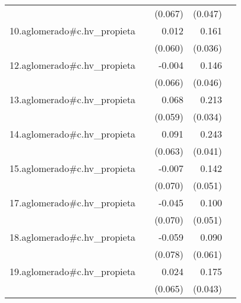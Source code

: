 {\begin{longtable}{l*{4}{D{.}{.}{-1}}}
            &                     &     (0.067)         &     (0.047)         &                     \\
\addlinespace
10.aglomerado#c.hv\_propieta&                     &       0.012         &       0.161\sym{***}&                     \\
            &                     &     (0.060)         &     (0.036)         &                     \\
\addlinespace
12.aglomerado#c.hv\_propieta&                     &      -0.004         &       0.146\sym{**} &                     \\
            &                     &     (0.066)         &     (0.046)         &                     \\
\addlinespace
13.aglomerado#c.hv\_propieta&                     &       0.068         &       0.213\sym{***}&                     \\
            &                     &     (0.059)         &     (0.034)         &                     \\
\addlinespace
14.aglomerado#c.hv\_propieta&                     &       0.091         &       0.243\sym{***}&                     \\
            &                     &     (0.063)         &     (0.041)         &                     \\
\addlinespace
15.aglomerado#c.hv\_propieta&                     &      -0.007         &       0.142\sym{**} &                     \\
            &                     &     (0.070)         &     (0.051)         &                     \\
\addlinespace
17.aglomerado#c.hv\_propieta&                     &      -0.045         &       0.100\sym{*}  &                     \\
            &                     &     (0.070)         &     (0.051)         &                     \\
\addlinespace
18.aglomerado#c.hv\_propieta&                     &      -0.059         &       0.090         &                     \\
            &                     &     (0.078)         &     (0.061)         &                     \\
\addlinespace
19.aglomerado#c.hv\_propieta&                     &       0.024         &       0.175\sym{***}&                     \\
            &                     &     (0.065)         &     (0.043)         &                     \\

\end{longtable}}
